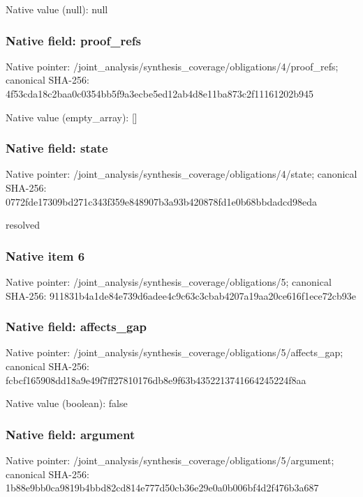 \documentclass[10pt,a4paper]{article}
\begin{document}
Native value (null): null

\subsubsection{Native field: proof\_\allowbreak{}refs}
Native pointer: /joint\_\allowbreak{}analysis/synthesis\_\allowbreak{}coverage/obligations/4/proof\_\allowbreak{}refs; canonical SHA-256: 4f53cda18c2baa0c0354bb5f9a3ecbe5ed12ab4d8e11ba873c2f11161202b945

Native value (empty\_\allowbreak{}array): []

\subsubsection{Native field: state}
Native pointer: /joint\_\allowbreak{}analysis/synthesis\_\allowbreak{}coverage/obligations/4/state; canonical SHA-256: 0772fde17309bd271c343f359e848907b3a93b420878fd1e0b68bbdadcd98eda

\begingroup\raggedright\sloppy resolved\par\endgroup

\subsubsection{Native item 6}
Native pointer: /joint\_\allowbreak{}analysis/synthesis\_\allowbreak{}coverage/obligations/5; canonical SHA-256: 911831b4a1de84e739d6adee4c9c63c3cbab4207a19aa20ce616f1ece72cb93e

\subsubsection{Native field: affects\_\allowbreak{}gap}
Native pointer: /joint\_\allowbreak{}analysis/synthesis\_\allowbreak{}coverage/obligations/5/affects\_\allowbreak{}gap; canonical SHA-256: fcbcf165908dd18a9e49f7ff27810176db8e9f63b4352213741664245224f8aa

Native value (boolean): false

\subsubsection{Native field: argument}
Native pointer: /joint\_\allowbreak{}analysis/synthesis\_\allowbreak{}coverage/obligations/5/argument; canonical SHA-256: 1b88e9bb0ca9819b4bbd82cd814e777d50cb36e29e0a0b006bf4d2f476b3a687
\end{document}
